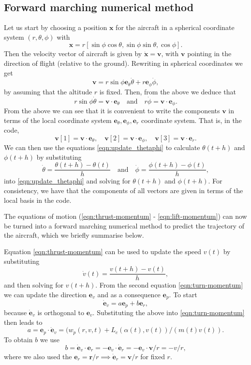 \documentclass{article}
\renewcommand{\vec}[1]{\boldsymbol{#1}}
\begin{document}
\subsection{Forward marching numerical method}

Let us start by choosing a position $\vec x$ for the aircraft in a spherical coordinate system $(r,\theta,\phi)$ with
\[
\vec x = r [ \sin \phi \cos \theta, \sin \phi \sin \theta,   \cos \phi].
\]
Then the velocity vector of aircraft is given by $\dot{\vec x} = \vec v$, with $\vec v$ pointing in the direction of flight (relative to the ground). Rewriting in spherical coordinates we get
\[
\vec v = r \sin \phi  {\vec e_\theta} \dot \theta + r  {\vec e_\phi} \dot \phi, 
\]
by assuming that the altitude $r$ is fixed. Then, from the above we deduce that
\begin{equation} \label{eqn:update_thetaphi}
    r \sin \phi \dot \theta = \vec v \cdot {\vec e}_\theta  \quad \text{and} \quad 
r \dot \phi = \vec v \cdot {\vec e}_\phi.
\end{equation}
From the above we can see that it is convenient to write the components $\vec v$ in terms of the local coordinate system ${\vec e}_\theta, {\vec e}_\phi, {\vec e}_r$ coordinate system. That is, in the code, 
\[
\vec v[1] = \vec v \cdot {\vec e}_\theta, \quad 
\vec v[2] = \vec v \cdot {\vec e}_\phi, 
\quad 
\vec v[3] = \vec v \cdot {\vec e}_r.
\]
We can then use the equations \eqref{eqn:update_thetaphi}  to calculate $\theta(t+h)$ and $\phi(t+h)$ by substituting 
\[
\dot \theta = \frac{ \theta(t+h) - \theta(t)}{h} \quad \text{and} \quad 
\dot \phi = \frac{ \phi(t+h) - \phi(t)}{h},
\]
into \eqref{eqn:update_thetaphi} and solving for $\theta(t+h)$ and $\phi(t+h)$. For consistency, we have that the components of all vectors are given in terms of the local basis in the code.

The equations of motion (\ref{eqn:thrust-momentum} - \ref{eqn:lift-momentum}) can now be turned into a forward marching numerical method to predict the trajectory of the aircraft, which we briefly summarise below.

Equation \eqref{eqn:thrust-momentum} can be used to update the speed $v(t)$ by substituting
\[
\dot { v}(t) = \frac{{v}(t+h) - {v}(t)}{h},
\]
and then solving for ${v}(t+h)$. From the second equation \eqref{eqn:turn-momentum} we can update the direction $\vec {e}_v$ and as a consequence $\vec e_p$. To start
\[
\dot{\vec e}_v = a {\vec e}_p + b {\vec e}_r, 
\]
because $\dot {\vec e}_v$ is orthogonal to ${\vec e}_v$. Substituting the above into \eqref{eqn:turn-momentum} then leads to
\begin{equation}
 a =  {\vec{e}}_p \cdot \dot{\vec{e}}_v =  (w_p(r,v,t) + L_c(\alpha(t),v(t) ) / (m(t) v(t)).
\end{equation}
To obtain $b$ we use 
\begin{equation}
b = \dot{\vec e}_v \cdot  {\vec e}_r = - {\vec e}_v \cdot  \dot {\vec e}_r =  - {\vec e}_v \cdot  {\vec v} / r = - v / r,    
\end{equation}
where we also used the $\vec e_r = \vec r / r \implies \dot{\vec e}_r = \vec v / r$ for fixed $r$.
\end{document}
